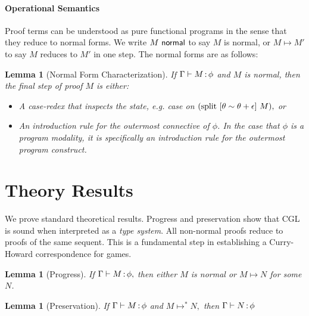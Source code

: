 \documentclass[12pt]{cmuthesis}
\newtheorem{lemma}[theorem]{Lemma}
\theoremstyle{definition}
\theoremstyle{remark}
\newcommand{\stepsto}{\mapsto}
\newcommand{\CGL}{\textsf{CGL}\xspace}
\begin{document}
\paragraph{Operational Semantics}
Proof terms can be understood as pure functional programs in the sense that they reduce to normal forms. We write $M\textsf{ normal}$ to say $M$ is normal, or $M \stepsto M'$ to say $M$ reduces to $M'$ in one step.
The normal forms are as follows:
\begin{lemma}[Normal Form Characterization]
\label{lem:normal-forms-alt}
If $\Gamma\allowbreak\vdash M \allowbreak \mathop{:} \phi$ and $M$ is normal, then the final step of proof $M$ is either:
\begin{itemize}
\item A case-redex that inspects the state, e.g. case on $(\textrm{split }{[\theta\sim\theta+\epsilon]}~M),$ or
\item An introduction rule for the outermost connective of $\phi$.
       In the case that $\phi$ is a program modality, it is specifically an introduction rule for the outermost program construct.
\end{itemize}
\end{lemma}
\section{Theory Results}
We prove standard theoretical results.
Progress and preservation show that \CGL is sound when interpreted as a \emph{type system}.
All non-normal proofs reduce to proofs of the same sequent.
This is a fundamental step in establishing a Curry-Howard correspondence for games.
\begin{lemma}[Progress]
If $\Gamma\allowbreak\vdash M \allowbreak \mathop{:} \phi,$ then either $M$ is normal or $M \stepsto N$ for some $N$.
\end{lemma}
\begin{lemma}[Preservation]
If $\Gamma\allowbreak\vdash M \allowbreak \mathop{:} \phi$ and $M \stepsto^* N,$ then $\Gamma\allowbreak\vdash N \allowbreak \mathop{:} \phi$
\end{lemma}
\end{document}
